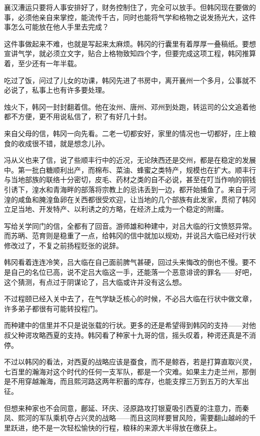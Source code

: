 襄汉漕运只要将人事安排好了，财务控制住了，完全可以放手。但韩冈现在要做的事，必须他亲自来掌控，能流传千古，同时也能将气学和格物之说发扬光大，这件事怎么可能放在他人手里去完成？

这件事做起来不难，也就是写起来太麻烦。韩冈的行囊里有着厚厚一叠稿纸。要想宣讲气学，就必须立文字，贴合上格物致知四个字，但要完成这项工程，韩冈推算着，至少还有一年半载。

吃过了饭，问过了儿女的功课，韩冈先进了书房中，离开襄州一个多月，公事就不必说了，私事上也有许多要处理。

烛火下，韩冈一封封翻着信。他在汝州、唐州、邓州到处跑，转运司的公文追着他都不方便，更不用说私信了，积了有好几十封。

来自父母的信，韩冈一向先看。二老一切都安好，家里的情况也一切都好，庄上粮食的收成很不错，就是想念儿孙。

冯从义也来了信，说了些顺丰行中的近况，无论陕西还是交州，都是在稳定的发展中。第一批白糖顺利出产，而棉布、菜油、蜂蜜之类特产，规模也在扩大。顺丰行与当地部族的联络十分密切，皮毛、药材之类的自不必说，甚至在叮当作响的铜钱引诱下，湟水和青海畔的部落将宗教上的忌讳丢到一边，都开始捕鱼了。来自于河湟的咸鱼和腌湟鱼卵在关西都很受欢迎，让当地的几个部族有此发家，贯彻了韩冈立足当地、开发特产、以利诱之的方略，在经济上成为一个稳定的附庸。

写给关学同门的信，全都有了回音。游师雄和种建中，对吕大临的行文愤怒异常。而苏昞、范育则是稳重了一点，给韩冈的信中就加以规劝，并说吕大临已经对行状修改过了，不复之前扬程贬张的说辞。

韩冈看着连连冷笑，吕大临在自己面前脾气甚硬，回过头来悔改的倒也不慢。要不是自己的名位已高，说不定吕大临这一手，还能落一个恶意诽谤的罪名——好吧，这个猜测，有点过于阴谋论了，吕大临或许并没有这么想。

不过程颐已经入关中去了，在气学缺乏核心的时候，不必吕大临在行状中做文章，许多弟子都很有可能转投程门。

而种建中的信里并不只是说张载的行状。更多的还是希望得到韩冈的支持——对他叔父种谔攻略西夏的支持。韩冈看了种家十九哥的信，摇头叹着，种谔还真是不消停。

不过以韩冈的看法，对西夏的战略应该是蚕食，而不是鲸吞，若是打算直取兴灵，七百里的瀚海对这个时代的任何一支军队，都是一个灾难。如果主力走兰州，那倒是不用穿越瀚海，而且熙河路这两年积蓄的库存，也能支撑三万到五万的大军出征。

但想来种家也不会同意，鄜延、环庆、泾原路攻打银夏吸引西夏的注意力，而秦凤、熙河的军队乘机夺占兴灵的战略——而且这同样要冒风险，需要翻山越岭的千里跃进，绝不是一次轻松愉快的行程，粮秣的来源大半得放在缴获上。

